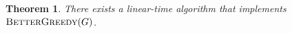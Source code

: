 \documentclass[a4paper,UKenglish, cleveref, autoref, thm-restate]{lipics-v2021}
\newtheorem{thm}{Theorem}
\newcommand{\defin}[1]{\emph{\textcolor{Maroon}{#1}}}
\begin{document}
\begin{thm}
    There exists a linear-time algorithm that implements $\textsc{BetterGreedy}(G)$.
\end{thm}



\end{document}
